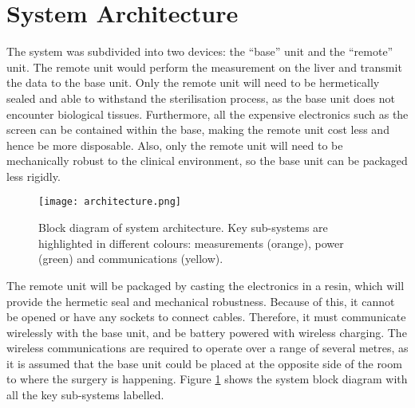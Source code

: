 \section{System Architecture}

The system was subdivided into two devices: the ``base'' unit and the ``remote'' unit. The remote unit would perform the measurement on the liver and transmit the data to the base unit. Only the remote unit will need to be hermetically sealed and able to withstand the sterilisation process, as the base unit does not encounter biological tissues. Furthermore, all the expensive electronics such as the screen can be contained within the base, making the remote unit cost less and hence be more disposable. Also, only the remote unit will need to be mechanically robust to the clinical environment, so the base unit can be packaged less rigidly. 


\begin{figure}[htbp]
	\centering
	\texttt{[image: architecture.png]}
	\caption{Block diagram of system architecture. Key sub-systems are highlighted in different colours: measurements (orange), power (green) and communications (yellow).}
	\label{fig: architecture}
\end{figure}

The remote unit will be packaged by casting the electronics in a resin, which will provide the hermetic seal and mechanical robustness. Because of this, it cannot be opened or have any sockets to connect cables. Therefore, it must communicate wirelessly with the base unit, and be battery powered with wireless charging. The wireless communications are required to operate over a range of several metres, as it is assumed that the base unit could be placed at the opposite side of the room to where the surgery is happening. Figure \ref{fig: architecture} shows the system block diagram with all the key sub-systems labelled.
